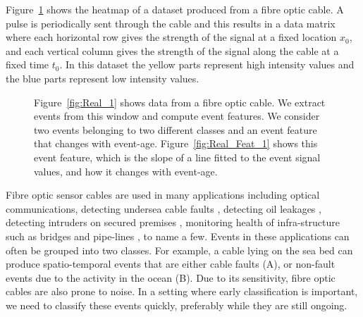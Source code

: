 \documentclass[a4paper,11pt]{article}
\begin{document}
Figure~\ref{fig:Real_World_Data} shows the heatmap of a dataset produced from a fibre optic cable. A pulse is periodically sent through the cable and this results in a data matrix where each horizontal row gives the strength of the signal at a fixed location $x_0$, and each vertical column gives the strength of the signal along the cable at a fixed time $t_0$. In this dataset the yellow parts represent high intensity values and the blue parts represent low intensity values.

\begin{figure}

	\caption{Figure~\ref{fig:Real_1} shows data from a fibre optic cable. We extract events  from this window and compute event features. We consider two events belonging to two different classes and an event feature that changes with event-age. Figure~\ref{fig:Real_Feat_1} shows this event feature, which is the slope of a line fitted to the event signal values, and how it changes with event-age.}
	\label{fig:Real_World_Data}
\end{figure}

Fibre optic sensor cables are used in many applications including optical communications, detecting undersea cable faults \citep{jiang2009technological}, detecting oil leakages \citep{nikles2004leakage}, detecting intruders on secured premises \citep{griffiths1995developments}, monitoring health of infra-structure such as bridges and pipe-lines \citep{li2004recent}, to name a few. Events in these applications can often be grouped into two classes. For example, a cable lying on the sea bed can produce spatio-temporal events that are either cable faults (A), or non-fault events due to the activity in the ocean (B). Due to its sensitivity, fibre optic cables are also prone to noise. In a setting where early classification is important, we need to classify these events quickly, preferably while they are still ongoing.
\end{document}
